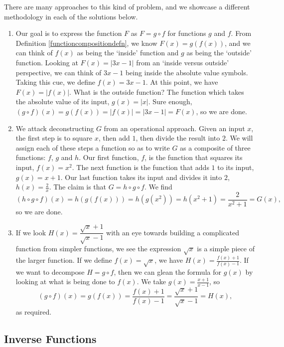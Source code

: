 {
There are many approaches to this kind of problem, and we showcase a different methodology in each of the solutions below.

\begin{enumerate}

\item  Our goal is to express the function $F$ as $F = g \circ f$ for functions $g$ and $f$.  From Definition \ref{functioncompositiondefn}, we know $F(x) = g(f(x))$, and we can think of $f(x)$ as being the `inside' function and $g$ as being the `outside' function.  Looking at $F(x) = |3x-1|$ from an `inside versus outside' perspective, we can think of $3x-1$ being inside the absolute value symbols.  Taking this cue, we define $f(x) = 3x-1$.  At this point, we have $F(x) = |f(x)|$.  What is the outside function?  The function which takes the absolute value of its input, $g(x) = |x|$. Sure enough,  $(g \circ f)(x) = g(f(x)) = |f(x)| = |3x-1| = F(x)$, so we are done.

\item  We attack deconstructing $G$ from an operational approach.  Given an input $x$, the first step is to square $x$, then add $1$, then divide the result into $2$.  We will assign each of these steps a function so as to write $G$ as a composite of three functions: $f$, $g$ and $h$.  Our first function, $f$, is the function that squares its input, $f(x) = x^2$.  The next function is the function that adds $1$ to its input, $g(x) = x+1$.  Our last function takes its input and divides it into $2$, $h(x) = \frac{2}{x}$.  The claim is that $G = h \circ g \circ f$. We find  \[(h \circ g \circ f)(x) = h(g(f(x))) = h(g\left(x^2\right)) = h\left(x^2+1\right)= \frac{2}{x^2+1} = G(x),\] so we are done.
\item  If we look $H(x) = \dfrac{\sqrt{x}+1}{\sqrt{x}-1}$ with an eye towards building a complicated function from simpler functions, we see the expression $\sqrt{x}$ is a simple piece of the larger function.  If we define $f(x) = \sqrt{x}$, we have $H(x) = \frac{f(x)+1}{f(x)-1}$.  If we want to decompose $H = g \circ f$, then we can glean the formula for $g(x)$ by looking at what is being done to $f(x)$.  We take $g(x) = \frac{x+1}{x-1}$, so \[(g \circ f)(x) = g(f(x)) = \frac{f(x)+1}{f(x)-1} = \frac{\sqrt{x}+1}{\sqrt{x}-1} = H(x),\] as required.  

\end{enumerate}
}

\newpage

\subsection{Inverse Functions}


